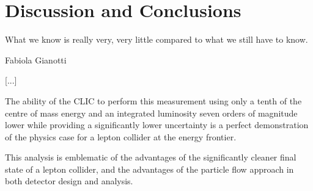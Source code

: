 \chapter{Discussion and Conclusions}
\label{chapter:discussion}

\epigraph{What we know is really very, very little compared to what we still have to know.}{Fabiola Gianotti}



%

[...]

The ability of the \acrlong{CLIC} to perform this measurement using only a tenth of the centre of mass energy and an integrated luminosity seven orders of magnitude lower while providing a significantly lower uncertainty is a perfect demonstration of the physics case for a lepton collider at the energy frontier.

This analysis is emblematic of the advantages of the significantly cleaner final state of a lepton collider, and the advantages of the particle flow approach in both detector design and analysis.